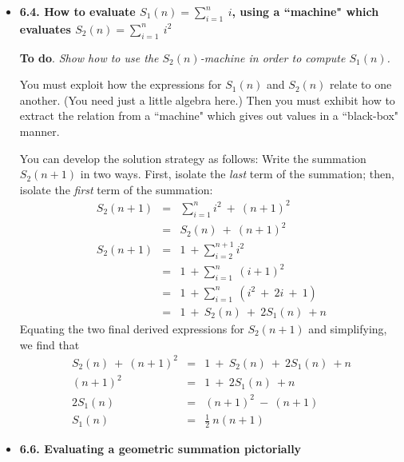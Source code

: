\begin{itemize}
\item
{\bf 6.4. How to evaluate $S_1(n) = \sum_{i=1}^n \ i$, using a ``machine" which evaluates $S_2(n) = \sum_{i=1}^n \ i^2$}
\smallskip

{\bf To do}. {\em Show how to use the $S_2(n)$-machine in order to compute $S_1(n)$.}

\medskip

You must exploit how the expressions for $S_1(n)$ and $S_2(n)$ relate to one another.  (You need just a little algebra here.)  Then you must exhibit how to extract the relation from a ``machine" which gives out values in a ``black-box" manner.

\smallskip

You can develop the solution strategy as follows:  
Write the summation $S_2(n+1)$ in two ways.  First, isolate the {\em last} term of the summation; then, isolate the {\em first} term of the summation:
\begin{eqnarray*}
S_2(n+1) & = &  \sum_{i=1}^{n} i^2 \ + \ (n+1)^2  \\
                & = & S_2(n) \ + \ (n+1)^2 \\
S_2(n+1) & = & 1 \ + \sum_{i=2}^{n+1} i^2 \\
                & = & 1 \ + \sum_{i=1}^{n} \ (i+1)^2 \\
                & = & 1 \ + \sum_{i=1}^{n} \ (i^2 \ + \ 2 i \ + \ 1) \\
                & = & 1 \ + \ S_2(n) \ + \ 2 S_1(n) \ + n
\end{eqnarray*} 
Equating the two final derived expressions for $S_2(n+1)$ and simplifying, we find that
\begin{eqnarray*}
 S_2(n) \ + \ (n+1)^2 & = & 1 \ + \ S_2(n) \ + \ 2 S_1(n) \ + n \\
                    (n+1)^2 & = & 1 \ + \ 2 S_1(n) \ + n \\
                  2 S_1(n) & = & (n+1)^2 \ - \ (n + 1) \\
                     S_1(n) & =  & \frac{1}{2} \ n(n+1) 
\end{eqnarray*} 

\medskip
\item
{\bf 6.6. Evaluating a geometric summation pictorially}

\smallskip



\end{itemize}
